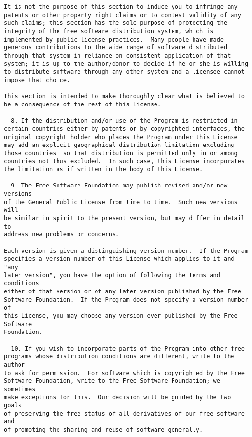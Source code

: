 \documentclass{article}
\begin{document}
\begin{appendix}
\begin{verbatim}
It is not the purpose of this section to induce you to infringe any
patents or other property right claims or to contest validity of any
such claims; this section has the sole purpose of protecting the
integrity of the free software distribution system, which is
implemented by public license practices.  Many people have made
generous contributions to the wide range of software distributed
through that system in reliance on consistent application of that
system; it is up to the author/donor to decide if he or she is willing
to distribute software through any other system and a licensee cannot
impose that choice.

This section is intended to make thoroughly clear what is believed to
be a consequence of the rest of this License.

  8. If the distribution and/or use of the Program is restricted in
certain countries either by patents or by copyrighted interfaces, the
original copyright holder who places the Program under this License
may add an explicit geographical distribution limitation excluding
those countries, so that distribution is permitted only in or among
countries not thus excluded.  In such case, this License incorporates
the limitation as if written in the body of this License.

  9. The Free Software Foundation may publish revised and/or new versions
of the General Public License from time to time.  Such new versions will
be similar in spirit to the present version, but may differ in detail to
address new problems or concerns.

Each version is given a distinguishing version number.  If the Program
specifies a version number of this License which applies to it and "any
later version", you have the option of following the terms and conditions
either of that version or of any later version published by the Free
Software Foundation.  If the Program does not specify a version number of
this License, you may choose any version ever published by the Free Software
Foundation.

  10. If you wish to incorporate parts of the Program into other free
programs whose distribution conditions are different, write to the author
to ask for permission.  For software which is copyrighted by the Free
Software Foundation, write to the Free Software Foundation; we sometimes
make exceptions for this.  Our decision will be guided by the two goals
of preserving the free status of all derivatives of our free software and
of promoting the sharing and reuse of software generally.


\end{verbatim}
\end{appendix}
\end{document}
